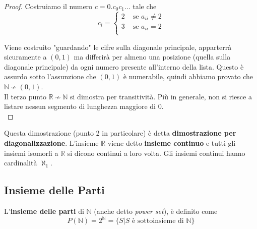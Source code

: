 \begin{proof}
	Costruiamo il numero $c = 0.c_0 c_1 \dots$ tale che
	$$ c_{i} = \begin{cases}
		2 & \text{ se } a_{ii} \neq 2 \\
		3 & \text{ se } a_{ii} = 2 \\
	\end{cases}$$
	
	Viene costruito "guardando" le cifre sulla diagonale principale, apparterrà sicuramente a $(0,1)$ ma differirà per almeno una posizione (quella sulla diagonale principale) da ogni numero presente all'interno della lista. Questo è assurdo sotto l'assunzione che $(0,1)$ è numerabile, quindi abbiamo provato che $\mathbb{N} \nsim (0,1)$.\\
	
	Il terzo punto $\mathbb{R} \nsim \mathbb{N}$ si dimostra per transitività. Più in generale, non si riesce a listare nessun segmento di lunghezza maggiore di 0.\\
\end{proof}

Questa dimostrazione (punto 2 in particolare) è detta \textbf{dimostrazione per diagonalizzazione}. L'insieme $\mathbb{R}$ viene detto \textbf{insieme continuo} e tutti gli insiemi isomorfi a $\mathbb{R}$ si dicono continui a loro volta. Gli insiemi continui hanno cardinalità $\aleph_1$.

\subsection{Insieme delle Parti}
L'\textbf{insieme delle parti} di $\mathbb{N}$ (anche detto \textit{power set}), è definito come
$$ P(\mathbb{N}) = 2^{\mathbb{N}} = \{S | S \text{ è sottoinsieme di } \mathbb{N}\} $$

